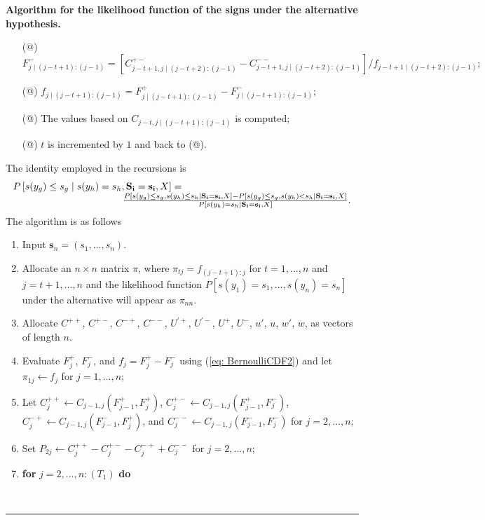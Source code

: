 \documentclass[harvard,11pt]{article}
\makeatletter
\newcommand*{\rom}[1]{\expandafter\@slowromancap\romannumeral #1@}
\newenvironment{proof}[1][Proof]{\textbf{#1.} }{\  \rule{0.5em}{0.5em}}
\makeatother
\begin{document}
\begin{proof}[Algorithm for the likelihood function of the signs under the alternative hypothesis]
\begin{itemize}
\item[(\rom{5})] $F_{j\mid (j-t+1):(j-1)}^-=\left[C_{j-t+1,j\mid(j-t+2):(j-1)}^{+-}-C_{j-t+1,j\mid(j-t+2):(j-1)}^{--}\right]/f_{j-t+1\mid(j-t+2):(j-1)};$
\item[(\rom{6})] $f_{j\mid (j-t+1):(j-1)}=F_{j\mid (j-t+1):(j-1)}^+-F_{j\mid (j-t+1):(j-1)}^-;$
\item[(\rom{7})] The values based on $C_{j-t,j\mid (j-t+1):(j-1)}$ is computed; 
\item[(\rom{8})] $t$ is incremented by $1$ and back to (\rom{1}).
\end{itemize}
The identity employed in the recursions is
\begingroup
\allowdisplaybreaks
\begin{align*}
\begin{array}{ll}
P\left[s(y_g)\leq s_g\mid s(y_h)=s_h,\mathbf{S_i}=\mathbf{s_i},X\right]=\\
\textcolor{white}{P[s(y_g)\leq s_g\mid s(y_h)=s_h,}\frac{P\left[s(y_g)\leq s_g, s(y_h)\leq s_h\mid\mathbf{S_i}=\mathbf{s_i},X\right]-P\left[s(y_g)\leq s_g, s(y_h)< s_h\mid\mathbf{S_i}=\mathbf{s_i},X\right]}{P\left[s(y_h)=s_h\mid \mathbf{S_i}=\mathbf{s_i},X\right]}.
\end{array}
\end{align*}
 \endgroup
The algorithm is as follows
\begin{enumerate}
\item Input $\mathbf{s}_n=\left(s_1,...,s_n\right)$.
\item Allocate an $n\times n$ matrix $\pi$, where $\pi_{tj}=f_{(j-t+1):j}$ for $t=1,...,n$ and $j=t+1,...,n$ and the likelihood function $P[s(y_1)=s_1,...,s(y_n)=s_n]$ under the alternative will appear as $\pi_{nn}$.
\item Allocate $C^{++}$, $C^{+-}$, $C^{-+}$, $C^{--}$, $U^{'+}$, $U^{'-}$, $U^{+}$, $U^{-}$, $u'$, $u$, $w'$, $w$, as vectors of length $n$.
\item Evaluate $F^{+}_j$, $F^{-}_j$, and $f_j=F^{+}_j-F^{-}_j$ using (\ref{eq: BernoulliCDF2}) and let $\pi_{1j}\leftarrow f_j$ for $j=1,...,n$;  
\item Let $C^{++}_j\leftarrow C_{j-1,j}\left(F^{+}_{j-1},F^{+}_{j}\right)$, $C^{+-}_j\leftarrow C_{j-1,j}\left(F^{+}_{j-1},F^{-}_{j}\right)$, $C^{-+}_j\leftarrow C_{j-1,j}\left(F^{-}_{j-1},F^{+}_{j}\right)$, and $C^{--}_j\leftarrow C_{j-1,j}\left(F^{-}_{j-1},F^{-}_{j}\right)$ for $j=2,...,n$;
\item  Set $P_{2j}\leftarrow C^{++}_j-C^{+-}_j-C^{-+}_j+C^{--}_j$ for $j=2,...,n$;
\item \textbf{for} $j=2,...,n:\left(T_1\right)$ \textbf{do}

\end{enumerate}
\end{proof}
\end{document}
